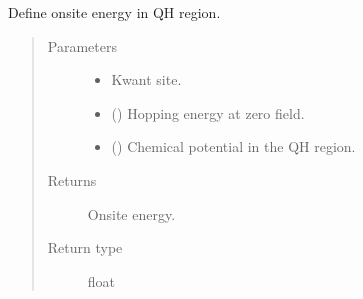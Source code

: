 \documentclass[letterpaper,10pt,english]{sphinxmanual}
\begin{document}

\begin{fulllineitems}
\label{\detokenize{modules:modules.functions.onsite_qh}}
\pysigstartsignatures
{}
\pysigstopsignatures
\sphinxAtStartPar
Define onsite energy in QH region.
\begin{quote}\begin{description}
\item[{Parameters}] \leavevmode\begin{itemize}
\item {} 
\sphinxAtStartPar
{} \textendash{} Kwant site.

\item {} 
\sphinxAtStartPar
{} () \textendash{} Hopping energy at zero field.

\item {} 
\sphinxAtStartPar
{} () \textendash{} Chemical potential in the QH region.

\end{itemize}

\item[{Returns}] \leavevmode
\sphinxAtStartPar
Onsite energy.

\item[{Return type}] \leavevmode
\sphinxAtStartPar
float

\end{description}\end{quote}

\end{fulllineitems}

\end{document}
